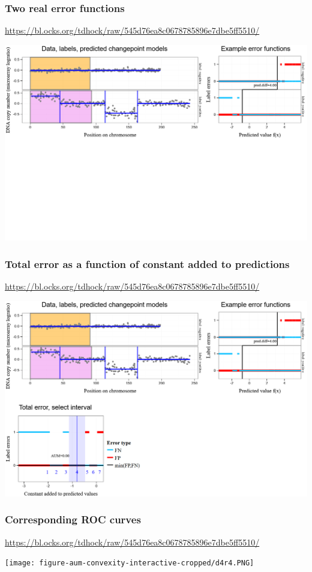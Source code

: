 \documentclass[t]{beamer}
\begin{document}
\begin{frame}
  \frametitle{Two real error functions}
  {\scriptsize\url{https://bl.ocks.org/tdhock/raw/545d76ea8c0678785896e7dbe5ff5510/}}

  \includegraphics[width=\textwidth]{figure-aum-convexity-interactive-cropped/d4r4-2.PNG}
\end{frame}

\begin{frame}
  \frametitle{Total error as a function of constant added to predictions}
  {\scriptsize\url{https://bl.ocks.org/tdhock/raw/545d76ea8c0678785896e7dbe5ff5510/}}

  \includegraphics[width=\textwidth]{figure-aum-convexity-interactive-cropped/d4r4-3.PNG}
\end{frame}

\begin{frame}
  \frametitle{Corresponding ROC curves}
  {\scriptsize\url{https://bl.ocks.org/tdhock/raw/545d76ea8c0678785896e7dbe5ff5510/}}

  \texttt{[image: figure-aum-convexity-interactive-cropped/d4r4.PNG]}
\end{frame}
\end{document}
